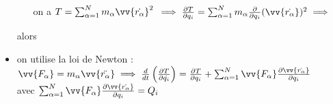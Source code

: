 \documentclass[12pt]{book}
\begin{document}
\begin{itemize}
\begin{itemize}
                        on a $T = \sum^N_{\alpha =1 }m_\alpha\vv{\dot{r_\alpha}}^2 $ 
                        $\implies \frac{\partial T}{\partial q_i} =  \sum^N_{\alpha =1 }m_\alpha\frac{\partial}{\partial q_i}(\vv{\dot{r_\alpha}})^2 \implies$
                \end{itemize}
                alors \begin{center}
                \end{center}
                \item on utilise la loi de Newton : $ \vv{F_\alpha} = m_\alpha\vv{\ddot{r_\alpha}} \implies  \frac{d}{dt}\left( \frac{\partial T}{\partial \dot{q_i}} \right) =\frac{\partial T}{\partial q_i} + \sum^N_{\alpha = 1}\vv{F_\alpha}\frac{\partial\vv{\dot{r_\alpha}}}{\partial q_i}$  \\
                avec $\sum^N_{\alpha = 1}\vv{F_\alpha}\frac{\partial\vv{\dot{r_\alpha}}}{\partial q_i} = Q_i$
                \begin{center}
                \end{center}
             \end{itemize}
\end{document}
